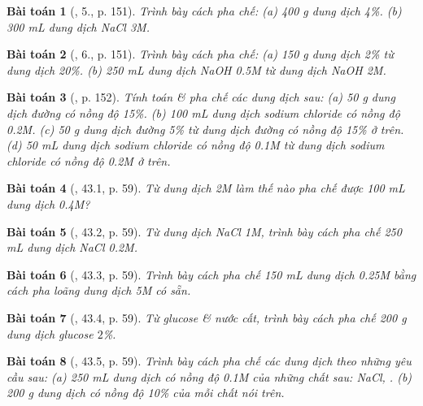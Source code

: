 \documentclass{article}
\newtheorem{baitoan}{Bài toán}
\begin{document}
\begin{baitoan}[\cite{SGK_Hoa_Hoc_8}, 5., p. 151]
	Trình bày cách pha chế: (a) \emph{400 g} dung dịch \emph{ 4\%}. (b) \emph{300 mL} dung dịch \emph{NaCl 3M}.
\end{baitoan}

\begin{baitoan}[\cite{SGK_Hoa_Hoc_8}, 6., p. 151]
	Trình bày cách pha chế: (a) \emph{150 g} dung dịch \emph{ 2\%} từ dung dịch \emph{ 20\%}. (b) \emph{250 mL} dung dịch \emph{NaOH 0.5M} từ dung dịch \emph{NaOH 2M}.
\end{baitoan}

\begin{baitoan}[\cite{SGK_Hoa_Hoc_8}, p. 152]
	Tính toán \& pha chế các dung dịch sau: (a) \emph{50 g} dung dịch đường có nồng độ \emph{15\%}. (b) \emph{100 mL} dung dịch sodium chloride có nồng độ \emph{0.2M}. (c) \emph{50 g} dung dịch đường 5\% từ dung dịch đường có nồng độ \emph{15\%} ở trên. (d) \emph{50 mL} dung dịch sodium chloride có nồng độ \emph{0.1M} từ dung dịch sodium chloride có nồng độ \emph{0.2M} ở trên.
\end{baitoan}

\begin{baitoan}[\cite{SBT_Hoa_Hoc_8}, 43.1, p. 59]
	Từ dung dịch \emph{ 2M} làm thế nào pha chế được \emph{100 mL} dung dịch \emph{ 0.4M}?
\end{baitoan}

\begin{baitoan}[\cite{SBT_Hoa_Hoc_8}, 43.2, p. 59]
	Từ dung dịch \emph{NaCl 1M}, trình bày cách pha chế \emph{250 mL} dung dịch \emph{NaCl 0.2M}.
\end{baitoan}

\begin{baitoan}[\cite{SBT_Hoa_Hoc_8}, 43.3, p. 59]
	Trình bày cách pha chế \emph{150 mL} dung dịch \emph{ 0.25M} bằng cách pha loãng dung dịch \emph{ 5M} có sẵn.
\end{baitoan}

\begin{baitoan}[\cite{SBT_Hoa_Hoc_8}, 43.4, p. 59]
	Từ glucose \emph{} \& nước cất, trình bày cách pha chế \emph{200 g} dung dịch glucose $2$\%.
\end{baitoan}

\begin{baitoan}[\cite{SBT_Hoa_Hoc_8}, 43.5, p. 59]
	Trình bày cách pha chế các dung dịch theo những yêu cầu sau: (a) \emph{250 mL} dung dịch có nồng độ \emph{0.1M} của những chất sau: \emph{NaCl, }. (b) \emph{200 g} dung dịch có nồng độ \emph{10\%} của mỗi chất nói trên.
\end{baitoan}
\end{document}
